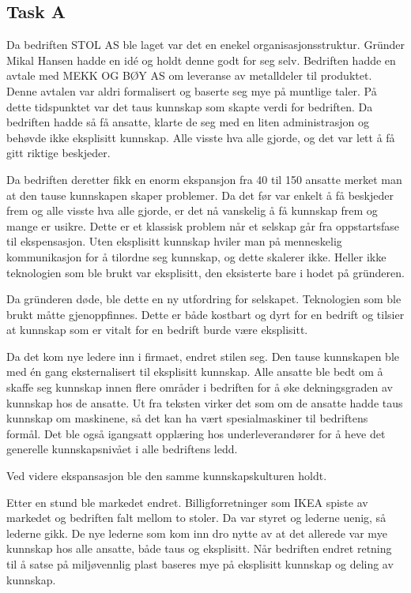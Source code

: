 \subsection{Task A}
Da bedriften STOL AS ble laget var det en enekel organisasjonsstruktur.
Gründer Mikal Hansen hadde en idé og holdt denne godt for seg selv.
Bedriften hadde en avtale med MEKK OG BØY AS om leveranse av metalldeler til produktet. Denne avtalen var aldri formalisert og baserte seg mye på muntlige taler.
På dette tidspunktet var det taus kunnskap som skapte verdi for bedriften.
Da bedriften hadde så få ansatte, klarte de seg med en liten administrasjon og behøvde ikke eksplisitt kunnskap. Alle visste hva alle gjorde, og det var lett å få gitt riktige beskjeder.

Da bedriften deretter fikk en enorm ekspansjon fra 40 til 150 ansatte merket man at den tause kunnskapen skaper problemer. Da det før var enkelt å få beskjeder frem og alle visste hva alle gjorde, er det nå vanskelig å få kunnskap frem og mange er usikre.
Dette er et klassisk problem når et selskap går fra oppstartsfase til ekspensasjon.
Uten eksplisitt kunnskap hviler man på menneskelig kommunikasjon for å tilordne seg kunnskap, og dette skalerer ikke.
Heller ikke teknologien som ble brukt var eksplisitt, den eksisterte bare i hodet på gründeren.

Da gründeren døde, ble dette en ny utfordring for selskapet. Teknologien som ble brukt måtte gjenoppfinnes.
Dette er både kostbart og dyrt for en bedrift og tilsier at kunnskap som er vitalt for en bedrift burde være eksplisitt.

Da det kom nye ledere inn i firmaet, endret stilen seg. Den tause kunnskapen ble med én gang eksternalisert til eksplisitt kunnskap.
Alle ansatte ble bedt om å skaffe seg kunnskap innen flere områder i bedriften for å øke dekningsgraden av kunnskap hos de ansatte.
Ut fra teksten virker det som om de ansatte hadde taus kunnskap om maskinene, så det kan ha vært spesialmaskiner til bedriftens formål.
Det ble også igangsatt opplæring hos underleverandører for å heve det generelle kunnskapsnivået i alle bedriftens ledd.

Ved videre ekspansasjon ble den samme kunnskapskulturen holdt.

Etter en stund ble markedet endret. Billigforretninger som IKEA spiste av markedet og bedriften falt mellom to stoler. Da var styret og lederne uenig, så lederne gikk.
De nye lederne som kom inn dro nytte av at det allerede var mye kunnskap hos alle ansatte, både taus og eksplisitt.
Når bedriften endret retning til å satse på miljøvennlig plast baseres mye på eksplisitt kunnskap og deling av kunnskap.

